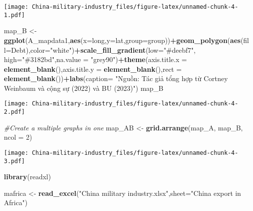 \documentclass[
]{article}
\newenvironment{Shaded}{\begin{snugshade}}{\end{snugshade}}
\newcommand{\AttributeTok}[1]{\textcolor[rgb]{0.13,0.29,0.53}{#1}}
\newcommand{\CommentTok}[1]{\textcolor[rgb]{0.56,0.35,0.01}{\textit{#1}}}
\newcommand{\DecValTok}[1]{\textcolor[rgb]{0.00,0.00,0.81}{#1}}
\newcommand{\FunctionTok}[1]{\textcolor[rgb]{0.13,0.29,0.53}{\textbf{#1}}}
\newcommand{\NormalTok}[1]{#1}
\newcommand{\OtherTok}[1]{\textcolor[rgb]{0.56,0.35,0.01}{#1}}
\newcommand{\SpecialCharTok}[1]{\textcolor[rgb]{0.81,0.36,0.00}{\textbf{#1}}}
\newcommand{\StringTok}[1]{\textcolor[rgb]{0.31,0.60,0.02}{#1}}
\begin{document}
\texttt{[image: China-military-industry\_files/figure-latex/unnamed-chunk-4-1.pdf]}

\begin{Shaded}
\begin{Highlighting}[]
\NormalTok{map\_B }\OtherTok{\textless{}{-}} \FunctionTok{ggplot}\NormalTok{(A\_mapdata1,}\FunctionTok{aes}\NormalTok{(}\AttributeTok{x=}\NormalTok{long,}\AttributeTok{y=}\NormalTok{lat,}\AttributeTok{group=}\NormalTok{group))}\SpecialCharTok{+}\FunctionTok{geom\_polygon}\NormalTok{(}\FunctionTok{aes}\NormalTok{(}\AttributeTok{fill=}\NormalTok{Debt),}\AttributeTok{color=}\StringTok{"white"}\NormalTok{)}\SpecialCharTok{+}\FunctionTok{scale\_fill\_gradient}\NormalTok{(}\AttributeTok{low=}\StringTok{"\#deebf7"}\NormalTok{, }\AttributeTok{high=}\StringTok{"\#3182bd"}\NormalTok{,}\AttributeTok{na.value =} \StringTok{"grey90"}\NormalTok{)}\SpecialCharTok{+}\FunctionTok{theme}\NormalTok{(}\AttributeTok{axis.title.x =} \FunctionTok{element\_blank}\NormalTok{(),}\AttributeTok{axis.title.y =} \FunctionTok{element\_blank}\NormalTok{(),}\AttributeTok{rect =} \FunctionTok{element\_blank}\NormalTok{())}\SpecialCharTok{+}\FunctionTok{labs}\NormalTok{(}\AttributeTok{caption=} \StringTok{"Nguồn: Tác giả tổng hợp từ Cortney Weinbaum và cộng sự (2022) và BU (2023)"}\NormalTok{)}
\NormalTok{map\_B}
\end{Highlighting}
\end{Shaded}

\texttt{[image: China-military-industry\_files/figure-latex/unnamed-chunk-4-2.pdf]}

\begin{Shaded}
\begin{Highlighting}[]
\CommentTok{\#Create a multiple graphs in one }
\NormalTok{map\_AB }\OtherTok{\textless{}{-}} \FunctionTok{grid.arrange}\NormalTok{(map\_A, map\_B, }\AttributeTok{ncol =} \DecValTok{2}\NormalTok{)}
\end{Highlighting}
\end{Shaded}

\texttt{[image: China-military-industry\_files/figure-latex/unnamed-chunk-4-3.pdf]}

\begin{Shaded}
\begin{Highlighting}[]
\FunctionTok{library}\NormalTok{(readxl)}

\NormalTok{mafrica }\OtherTok{\textless{}{-}} \FunctionTok{read\_excel}\NormalTok{(}\StringTok{"China military industry.xlsx"}\NormalTok{,}\AttributeTok{sheet=}\StringTok{"China export in Africa"}\NormalTok{)}
\end{Highlighting}
\end{Shaded}
\end{document}
